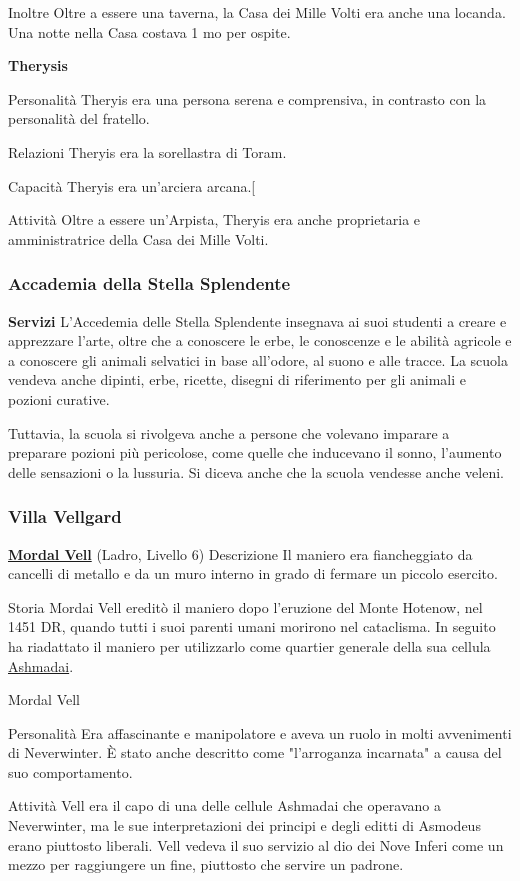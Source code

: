 \documentclass{article}
\begin{document}
Inoltre
Oltre a essere una taverna, la Casa dei Mille Volti era anche una locanda. Una notte nella Casa costava 1 mo per ospite.

\hypertarget{ther}{\textbf{Therysis}}
Personalità
Theryis era una persona serena e comprensiva, in contrasto con la personalità del fratello.

Relazioni
Theryis era la sorellastra di Toram.

Capacità
Theryis era un'arciera arcana.[

Attività
Oltre a essere un'Arpista, Theryis era anche proprietaria e amministratrice della Casa dei Mille Volti.

\subsubsection{Accademia della Stella Splendente}
\textbf{Servizi}
L'Accedemia delle Stella Splendente insegnava ai suoi studenti a creare e apprezzare l'arte, oltre che a conoscere le erbe, le conoscenze e le abilità agricole e a conoscere gli animali selvatici in base all'odore, al suono e alle tracce. La scuola vendeva anche dipinti, erbe, ricette, disegni di riferimento per gli animali e pozioni curative.

Tuttavia, la scuola si rivolgeva anche a persone che volevano imparare a preparare pozioni più pericolose, come quelle che inducevano il sonno, l'aumento delle sensazioni o la lussuria. Si diceva anche che la scuola vendesse anche veleni.

\subsubsection{Villa Vellgard}
\hyperlink{mor}{\textbf{Mordal Vell}} (Ladro, Livello 6)
Descrizione
Il maniero era fiancheggiato da cancelli di metallo e da un muro interno in grado di fermare un piccolo esercito.

Storia
Mordai Vell ereditò il maniero dopo l'eruzione del Monte Hotenow, nel 1451 DR, quando tutti i suoi parenti umani morirono nel cataclisma. In seguito ha riadattato il maniero per utilizzarlo come quartier generale della sua cellula \hyperlink{ash}{Ashmadai}.\newline

\hypertarget{mor}{Mordal Vell}
Personalità
Era affascinante e manipolatore e aveva un ruolo in molti avvenimenti di Neverwinter. È stato anche descritto come "l'arroganza incarnata" a causa del suo comportamento.

Attività
Vell era il capo di una delle cellule Ashmadai che operavano a Neverwinter, ma le sue interpretazioni dei principi e degli editti di Asmodeus erano piuttosto liberali. Vell vedeva il suo servizio al dio dei Nove Inferi come un mezzo per raggiungere un fine, piuttosto che servire un padrone.
\end{document}
